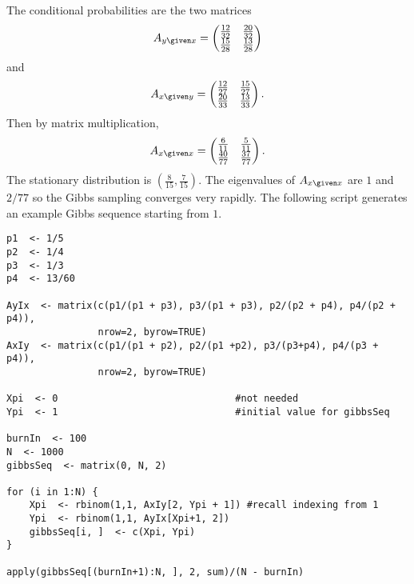 \documentclass[12pt]{article}
\begin{document}
\begin{solution}
    The conditional probabilities are the two matrices
    \[
        A_{y \given x} =
        \begin{pmatrix}
            \frac{12}{32} & \frac{20}{32} \\
            \frac{15}{28} & \frac{13}{28}
        \end{pmatrix}
    \] and
    \[
        A_{x \given y} =
        \begin{pmatrix}
            \frac{12}{27} & \frac{15}{27} \\
            \frac{20}{33} & \frac{13}{33}
        \end{pmatrix}
        .
    \] Then by matrix multiplication,
    \[
        A_{x \given x} =
        \begin{pmatrix}
            \frac{6}{11} & \frac{5}{11}\\
            \frac{40}{77} & \frac{37}{77}
        \end{pmatrix}
        .
    \] The stationary distribution is \( (\frac{8}{15}, \frac{7}{15}) \).
    The eigenvalues of \( A_{x \given x} \) are \( 1 \) and \( 2/77 \)
    so the Gibbs sampling converges very rapidly.  The following script
    generates an example Gibbs sequence starting from \( 1 \).
\begin{lstlisting}
p1  <- 1/5
p2  <- 1/4
p3  <- 1/3
p4  <- 13/60

AyIx  <- matrix(c(p1/(p1 + p3), p3/(p1 + p3), p2/(p2 + p4), p4/(p2 + p4)),
                nrow=2, byrow=TRUE)
AxIy  <- matrix(c(p1/(p1 + p2), p2/(p1 +p2), p3/(p3+p4), p4/(p3 + p4)),
                nrow=2, byrow=TRUE)

Xpi  <- 0                               #not needed
Ypi  <- 1                               #initial value for gibbsSeq

burnIn  <- 100
N  <- 1000
gibbsSeq  <- matrix(0, N, 2)

for (i in 1:N) {
    Xpi  <- rbinom(1,1, AxIy[2, Ypi + 1]) #recall indexing from 1
    Ypi  <- rbinom(1,1, AyIx[Xpi+1, 2])
    gibbsSeq[i, ]  <- c(Xpi, Ypi)
}

apply(gibbsSeq[(burnIn+1):N, ], 2, sum)/(N - burnIn)
\end{lstlisting}
\end{solution}
\end{document}
